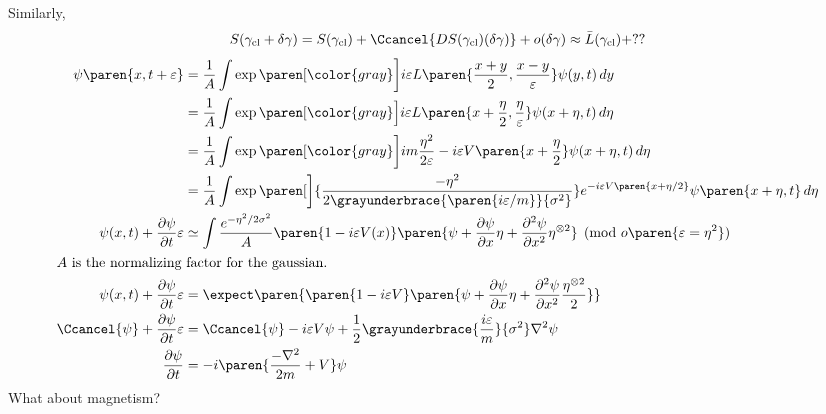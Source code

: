 \documentclass{scrartcl}
\def\epsilon{\varepsilon}
\begin{document}
\newcommand{\cl}{\text{cl}}
Similarly,
\[
  S(\gamma_\cl+\delta\gamma) = S(\gamma_\cl) + \Ccancel{DS(\gamma_\cl)(\delta\gamma)} + o(\delta\gamma) \approx \bar L(\gamma_\cl) + ??
\]
\begin{align*}
  \psi\paren{x,t+\epsilon}
  &= \frac1A \int \exp\paren[\color{gray}\bigg]{i\epsilon L\paren{\frac{x+y}{2},\frac{x-y}\epsilon}}\psi(y,t)\, dy \\
  &= \frac1A \int \exp\paren[\color{gray}\Big]{i\epsilon L\paren{x+\frac{\eta}2,\frac{\eta}\epsilon}}\psi(x+\eta,t)\, d\eta \\
  &= \frac1A \int \exp\paren[\color{gray}\bigg]{i{m}\frac{\eta^2}{2\epsilon } - i\epsilon V\paren{x+\frac{\eta}2}}\psi(x+\eta,t)\, d\eta \\
  &= \frac1A \int \exp\paren[\bigg]{\frac{-\eta^2}{2\grayunderbrace{\paren{i\epsilon/m}}{\sigma^2}}}e^{-i\epsilon V\paren{x+\eta/2}} \psi\paren{x+\eta,t}\,d\eta \\
  \psi(x,t)+\frac{\partial \psi}{\partial t}\epsilon&\simeq  \int \frac{e^{-\eta^2/2\sigma^2}}{A}\paren{1 -i\epsilon V(x)}\paren{\psi + \frac{\partial \psi}{\partial x}\eta + \frac{\partial^2\psi}{\partial x^2}\eta^{\otimes2}} \pmod{o\paren{\epsilon=\eta^2}} \\
  \shortintertext{\(A\) is the normalizing factor for the gaussian.}
  \psi(x,t)+\frac{\partial \psi}{\partial t}\epsilon&=  \expect \paren{\paren{1 -i\epsilon V}\paren{\psi + \frac{\partial \psi}{\partial x}\eta + \frac{\partial^2\psi}{\partial x^2}\frac{\eta^{\otimes2}}2}} \\
  \Ccancel{\psi}+\frac{\partial \psi}{\partial t}\epsilon&= \Ccancel{\psi} -i\epsilon V\psi + \frac{1}{2}\grayunderbrace{\frac{i\epsilon}{m}}{\sigma^2}\nabla^2 \psi \\
  \frac{\partial\psi}{\partial t} &= -i\paren{\frac{-\nabla^2}{2m}+V}\psi
\end{align*}
What about magnetism?
\end{document}
